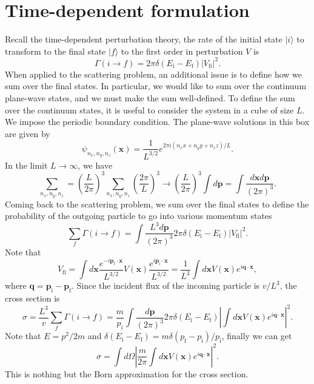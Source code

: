 \section{Time-dependent formulation}
Recall the time-dependent perturbation theory, the rate of the initial state $|i\rangle$ to transform to the final state $|f\rangle$ to the first order in perturbation $V$ is
\[\Gamma(i \to f) = 2\pi \delta(E_{\mathrm{i}}-E_{\mathrm{f}}) |V_{\mathrm{fi}}|^2.\]
When applied to the scattering problem, an additional issue is to define how we sum over the final states. 
In particular, we would like to sum over the continuum plane-wave states, and we must make the sum well-defined.
To define the sum over the continuum states, it is useful to consider the system in a cube of size $L$. 
We impose the periodic boundary condition. The plane-wave solutions in this box are given by
\[\psi_{n_x,n_y,n_z}(\bm{x}) = \frac{1}{L^{3/2}} e^{2\pi i(n_x x + n_y y + n_z z)/L}.\]
In the limit $L \to \infty$, we have
\[\sum_{n_x,n_y,n_z} = \left( \frac{L}{2\pi}\right)^3 \sum_{n_x,n_y,n_z} \left( \frac{2\pi}{L}\right)^3 \to \left( \frac{L}{2\pi}\right)^3 \int d\bm{p} = \int \frac{d\bm{x}d\bm{p}}{(2\pi)^3}.\]
Coming back to the scattering problem, we sum over the final states to define the probability of the outgoing particle to go into various momentum states
\[\sum_{f} \Gamma(i \to f) = \int \frac{L^3 d\bm{p}}{(2\pi)^3} 2\pi \delta(E_{\mathrm{i}}-E_{\mathrm{f}}) |V_{\mathrm{fi}}|^2.\]
Note that
\[V_{\mathrm{fi}} = \int d\bm{x} \frac{e^{-i\bm{p}_{\mathrm{f}} \cdot \bm{x}}}{L^{3/2}} V(\bm{x}) \frac{e^{i\bm{p}_{\mathrm{i}} \cdot \bm{x}}}{L^{3/2}}  = \frac{1}{L^3} \int d\bm{x} V(\bm{x}) e^{i\bm{q}\cdot\bm{x}},\]
where $\bm{q} = \bm{p}_{\mathrm{i}} - \bm{p}_{\mathrm{f}}$.
Since the incident flux of the incoming particle is ${v}/{L^3}$, the cross section is
\[\sigma = \frac{L^3}{v} \sum_{f} \Gamma(i \to f) =  \frac{m}{p_{\mathrm{i}}} \int \frac{ d\bm{p}}{(2\pi)^3} 2\pi \delta(E_{\mathrm{i}}-E_{\mathrm{f}}) \left |\int d\bm{x} V(\bm{x}) e^{i\bm{q}\cdot\bm{x}} \right|^2.\]
Note that $E = {p^2}/{2m}$ and $\delta(E_{\mathrm{i}}-E_{\mathrm{f}}) = {m} \delta(p_{\mathrm{f}}-p_{\mathrm{i}})/{p_{\mathrm{i}}}$, finally we can get
\[\sigma = \int d\Omega \left | \frac{m}{2\pi} \int d\bm{x} V(\bm{x}) e^{i\bm{q}\cdot\bm{x}} \right|^2.\]
This is nothing but the Born approximation for the cross section.